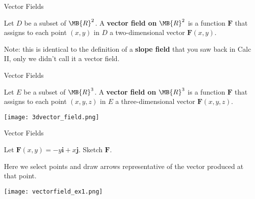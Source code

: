 \documentclass[11pt,english,
handout
]{beamer}
\begin{document}
\begin{frame}[t]{Vector Fields}
\small

\begin{definition}
Let $D$ be a subset of $\MB{R}^2$. A \textbf{vector field on} $\MB{R}^2$ is a function $\mathbf{F}$ that assigns to each point $(x,y)$ in $D$ a two-dimensional vector $\mathbf{F}(x,y)$.
\end{definition}


Note: this is identical to the definition of a \textbf{slope field} that you saw back in Calc II, only we didn't call it a vector field.

\lspace
{}
\end{frame}

















\begin{frame}[t]{Vector Fields}
\small

\begin{definition}
Let $E$ be a subset of $\MB{R}^3$. A \textbf{vector field on $\MB{R}^3$} is a function $\mathbf{F}$ that assigns to each point $(x,y,z)$ in $E$ a three-dimensional vector $\mathbf{F}(x,y,z)$.\

\lspace
\begin{center}
\texttt{[image: 3dvector\_field.png]}
\end{center}
\end{definition}
\end{frame}









\begin{frame}[t]{Vector Fields}
\small
\begin{example}
Let $\mathbf{F}(x,y)=-y\mathbf{i}+x\mathbf{j}$. Sketch $\mathbf{F}$.\pause 

\lspace
Here we select points and draw arrows representative of the vector produced at that point.

\begin{center}
\texttt{[image: vectorfield\_ex1.png]}
\end{center}
\end{example}
\end{frame}
\end{document}
